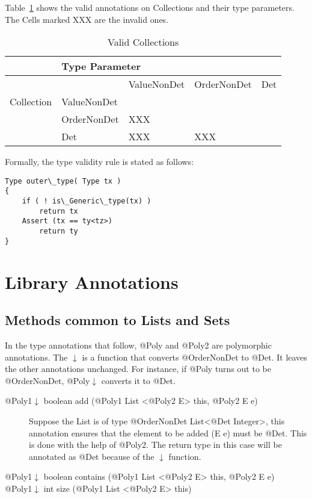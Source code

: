 Table~\ref{Tab:validity} shows the valid annotations on Collections and their type parameters. 
The Cells marked XXX are the invalid ones.
\begin{table}[h]
	\centering
	\caption{Valid Collections}
	\label{Tab:validity}
	\begin{tabular}{|l|l|l|l|l|}
		\hline
		& 		\multicolumn{4}{l|}{Type Parameter}		                                                                   \\ \hline
		&             & ValueNonDet                                     & OrderNonDet              & Det \\ \cline{2-5} 
		Collection    & ValueNonDet &                                                 &                          &     \\ \cline{2-5} 
		& OrderNonDet &   XXX  &                          &     \\ \cline{2-5} 
		& Det         &         XXX               &  	XXX	&     \\ \hline
	\end{tabular}
\end{table}

Formally, the type validity rule is stated as follows:

\begin{prooftree}
\end{prooftree}

\begin{verbatim}
Type outer\_type( Type tx )
{
    if ( ! is\_Generic\_type(tx) )
        return tx
    Assert (tx == ty<tz>)
        return ty
}
\end{verbatim}

\section{Library Annotations\label{Sec:LibAnno}}
\subsection{Methods common to Lists and Sets\label{SubSec:methods}}
In the type annotations that follow, @Poly and @Poly2 are polymorphic annotations. The $\downarrow$ is a function
that converts @OrderNonDet to @Det. It leaves the other annotations unchanged. For instance, if @Poly turns out to be
@OrderNonDet, @Poly$\downarrow$ converts it to @Det. 
\begin{description}
	\item[@Poly1$\downarrow$  boolean add (@Poly1 List <@Poly2 E> this, @Poly2 E e)] Suppose the List is of
	type @OrderNonDet List<@Det Integer>, this annotation ensures that the element to be added (E e) must be @Det. This is
	done with the help of @Poly2. The return type in this case will be annotated as @Det because of the $\downarrow$ function.
	\item[@Poly1$\downarrow$  boolean contains (@Poly1 List <@Poly2 E> this, @Poly2 E e)] 
	\item[@Poly1$\downarrow$  int size (@Poly1 List <@Poly2 E> this)] 
\end{description}

